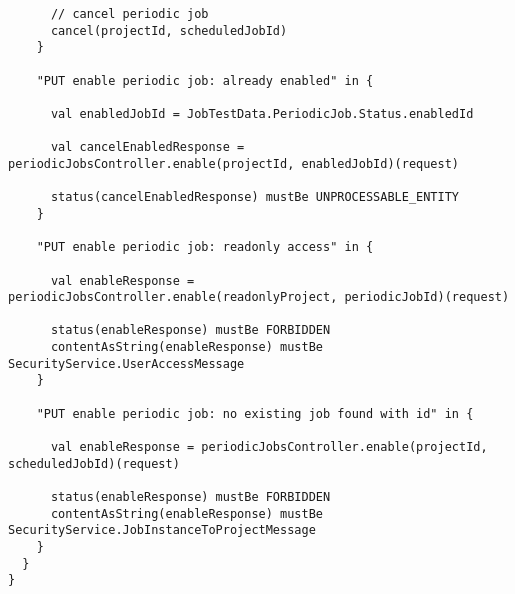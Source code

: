 \begin{lstlisting}
      // cancel periodic job
      cancel(projectId, scheduledJobId)
    }

    "PUT enable periodic job: already enabled" in {

      val enabledJobId = JobTestData.PeriodicJob.Status.enabledId

      val cancelEnabledResponse = periodicJobsController.enable(projectId, enabledJobId)(request)

      status(cancelEnabledResponse) mustBe UNPROCESSABLE_ENTITY
    }

    "PUT enable periodic job: readonly access" in {

      val enableResponse = periodicJobsController.enable(readonlyProject, periodicJobId)(request)

      status(enableResponse) mustBe FORBIDDEN
      contentAsString(enableResponse) mustBe SecurityService.UserAccessMessage
    }

    "PUT enable periodic job: no existing job found with id" in {

      val enableResponse = periodicJobsController.enable(projectId, scheduledJobId)(request)

      status(enableResponse) mustBe FORBIDDEN
      contentAsString(enableResponse) mustBe SecurityService.JobInstanceToProjectMessage
    }
  }
}
\end{lstlisting}
